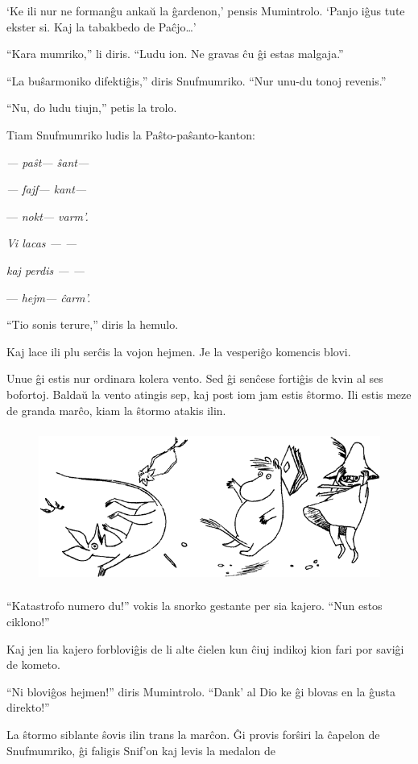 `Ke ili nur ne formanĝu ankaŭ la ĝardenon,' pensis Mumintrolo. `Panjo iĝus tute ekster si. Kaj la tabakbedo de Paĉjo{\ldots}'

``Kara mumriko,'' li diris. ``Ludu ion. Ne gravas ĉu ĝi estas malgaja.''

``La buŝarmoniko difektiĝis,'' diris Snufmumriko. ``Nur unu-du tonoj revenis.''

``Nu, do ludu tiujn,'' petis la trolo.

Tiam Snufmumriko ludis la Paŝto-paŝanto-kanton:

\emph{--- paŝt--- ŝant---}

\emph{--- fajf--- kant---}

--- \emph{nokt--- varm'.}

\emph{Vi lacas --- ---}

\emph{kaj perdis --- ---}

--- \emph{hejm--- ĉarm'.}

``Tio sonis terure,'' diris la hemulo.

Kaj lace ili plu serĉis la vojon hejmen. Je la vesperiĝo komencis blovi.

Unue ĝi estis nur ordinara kolera vento. Sed ĝi senĉese fortiĝis de kvin al ses bofortoj. Baldaŭ la vento atingis sep, kaj post iom jam estis ŝtormo. Ili estis meze de granda marĉo, kiam la ŝtormo atakis ilin.

\begin{figure}[htbp]
\centering
\includegraphics[width=350pt,height=143pt]{8-6.png}
\caption{}
\label{8-6}
\end{figure}

``Katastrofo numero du!'' vokis la snorko gestante per sia kajero. ``Nun estos ciklono!''

Kaj jen lia kajero forbloviĝis de li alte ĉielen kun ĉiuj indikoj kion fari por saviĝi de kometo.

``Ni bloviĝos hejmen!'' diris Mumintrolo. ``Dank' al Dio ke ĝi blovas en la ĝusta direkto!''

La ŝtormo siblante ŝovis ilin trans la marĉon. Ĝi provis forŝiri la ĉapelon de Snufmumriko, ĝi faligis Snif'on kaj levis la medalon de

